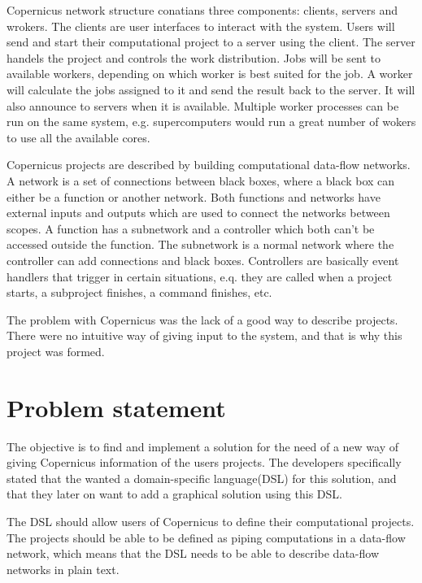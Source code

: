Copernicus network structure conatians three components: clients,
servers and wrokers. The clients are user interfaces to interact with
the system. Users will send and start their computational project to a
server using the client. The server handels the project and controls
the work distribution. Jobs will be sent to available workers,
depending on which worker is best suited for the job. A worker will
calculate the jobs assigned to it and send the result back to the
server. It will also announce to servers when it is
available. Multiple worker processes can be run on the same system,
e.g. supercomputers would run a great number of wokers to use all the
available cores.

Copernicus projects are described by building computational data-flow
networks. A network is a set of connections between black boxes, where
a black box can either be a function or another network. Both
functions and networks have external inputs and outputs which are used
to connect the networks between scopes. A function has a subnetwork
and a controller which both can't be accessed outside the
function. The subnetwork is a normal network where the controller can
add connections and black boxes. Controllers are basically event
handlers that trigger in certain situations, e.q. they are called when
a project starts, a subproject finishes, a command finishes,
etc\citep{pronk:2011}.


The problem with Copernicus was the lack of a good way to describe
projects. There were no intuitive way of giving input to the system,
and that is why this project was formed.


\section{Problem statement}
The objective is to find and implement a solution for the need of a
new way of giving Copernicus information of the users projects. The
developers specifically stated that the wanted a domain-specific
language(DSL) for this solution, and that they later on want to add a
graphical solution using this DSL.

The DSL should allow users of Copernicus to define their computational
projects. The projects should be able to be defined as piping
computations in a data-flow network, which means that the DSL needs to
be able to describe data-flow networks in plain text.

